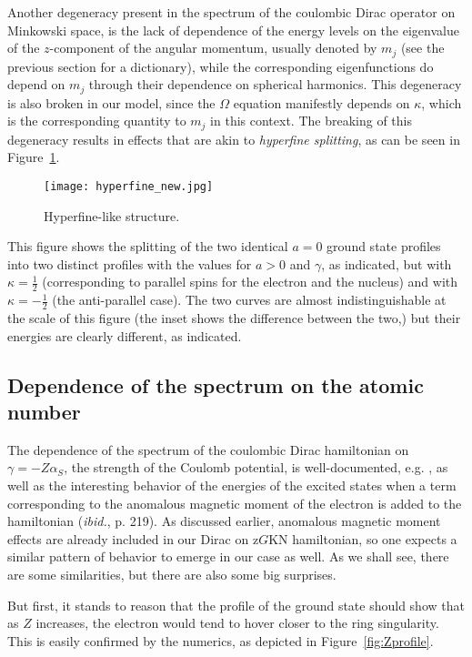 \documentclass[11 pt]{article}
\renewcommand\({\left(}
\renewcommand\){\right)}
\newcommand\<{\langle}
\renewcommand\>{\rangle}
\newcommand\8{\infty}
\newcommand{\al} {\alpha}\newcommand{\Al}{\Alpha}
\newcommand{\half}{\frac{1}{2}}
\begin{document}
Another degeneracy present in the spectrum of the coulombic Dirac operator on Minkowski space, is the lack of dependence of the energy levels on the eigenvalue of the $z$-component of the angular momentum, usually denoted by $m_j$ (see the previous section for a dictionary), while the corresponding eigenfunctions do depend on $m_j$ through their dependence on spherical harmonics.  This degeneracy is also broken in our model, since the $\Omega$ equation manifestly depends on $\kappa$, which is the corresponding quantity to $m_j$ in this context.  The breaking of this degeneracy results in effects that are akin to {\em hyperfine splitting}, as can be seen in Figure~\ref{fig:hyperfine}.
\begin{figure}[h!]
\centering
\texttt{[image: hyperfine\_new.jpg]}
\caption{Hyperfine-like structure.}
\label{fig:hyperfine}
\end{figure}
This figure shows the splitting of the two identical $a=0$ ground state profiles into two distinct
profiles with the values for $a>0$ and $\gamma$, as indicated, but with $\kappa = \half$ (corresponding to parallel spins for the electron and the nucleus) and with $\kappa = -\half$ (the anti-parallel case).  The two curves are almost indistinguishable at the scale of this figure (the inset shows the difference between the two,) but their energies are clearly different, as indicated.

\subsection{Dependence of the spectrum on the atomic number}

The dependence of the spectrum of the coulombic Dirac hamiltonian on $\gamma = -Z\al_S$, the strength of the Coulomb potential, is well-documented, e.g. \cite{ThallerBOOK}, as well as the interesting behavior of the energies of the excited states when a term corresponding to the anomalous magnetic moment of the electron is added to the hamiltonian ({\em ibid.}, p. 219).  As discussed earlier, anomalous magnetic moment effects are already included in our Dirac on z$G$KN hamiltonian, so one expects a similar pattern of behavior to emerge in our case as well.  As we shall see, there are some similarities, but there are also some big surprises.

But first, it stands to reason that the profile of the ground state should show that as $Z$ increases, the electron would tend to hover closer to the ring singularity.  This is easily confirmed by the numerics, as depicted in Figure~\ref{fig:Zprofile}.
\end{document}
